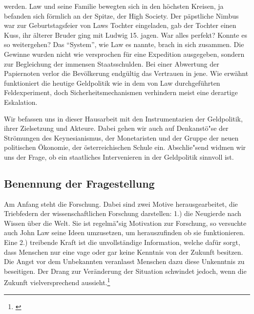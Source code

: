 \documentclass[
        onecolumn,
        a4paper,
        abstracton,
        parskip=half
        ,final
        ]{scrartcl}
\begin{document}
werden. Law und seine Familie bewegten sich in den h{\"o}chsten Kreisen, ja befanden sich f{\"o}rmlich an der Spitze, der High Society. Der p{\"a}pstliche Nimbus war zur Geburtstagsfeier von Laws Tochter eingeladen, gab der Tochter einen Kuss, ihr {\"a}lterer Bruder ging mit Ludwig 15. jagen.
War alles perfekt? Konnte es so weitergehen? Das "`System"', wie Law es nannte, brach in sich zusammen. Die Gewinne wurden nicht wie versprochen f{\"u}r eine Expedition ausgegeben, sondern zur Begleichung der immensen Staatsschulden. Bei einer Abwertung der Papiernoten verlor die Bev{\"o}lkerung endg{\"u}ltig das Vertrauen in jene.
Wie erw{\"a}hnt funktioniert die heutige Geldpolitik wie in dem von Law durchgef{\"u}hrten Feldexperiment, doch Sicherheitsmechanismen verhindern meist eine derartige Eskalation.

Wir befassen uns in dieser Hausarbeit mit den Instrumentarien der Geldpolitik, ihrer Zielsetzung und Akteure. Dabei gehen wir auch auf Denkanst{\"o}{"s}e der Str{\"o}mungen des Keynesianismus, der Monetaristen und der Gruppe der neuen politischen {\"O}konomie, der {\"o}sterreichischen Schule ein. Abschlie{"s}end widmen wir uns der Frage, ob ein staatliches Intervenieren in der Geldpolitik sinnvoll ist.





\subsection{Benennung der Fragestellung}


Am Anfang steht die Forschung. Dabei sind zwei Motive herausgearbeitet, die Triebfedern der wissenschaftlichen Forschung darstellen:
1.) die Neugierde nach Wissen {\"u}ber die Welt. Sie ist regelm{\"a}{"s}ig Motivation zur Forschung, so versuchte auch John Law  seine Ideen umzusetzen, um herauszufinden ob sie funktionieren.
Eine 2.) treibende Kraft ist die unvollst{\"a}ndige Information, welche daf{\"u}r sorgt, dass Menschen nur eine vage oder gar keine Kenntnis von der Zukunft besitzen. Die Angst vor dem Unbekannten veranlasst Menschen dazu diese Unkenntnis zu beseitigen. Der Drang zur Ver{\"a}nderung der Situation schwindet jedoch, wenn die Zukunft vielversprechend aussieht.\footnote[10]{ \citep*[S.11]{bombach1981theorie}} 
\end{document}
